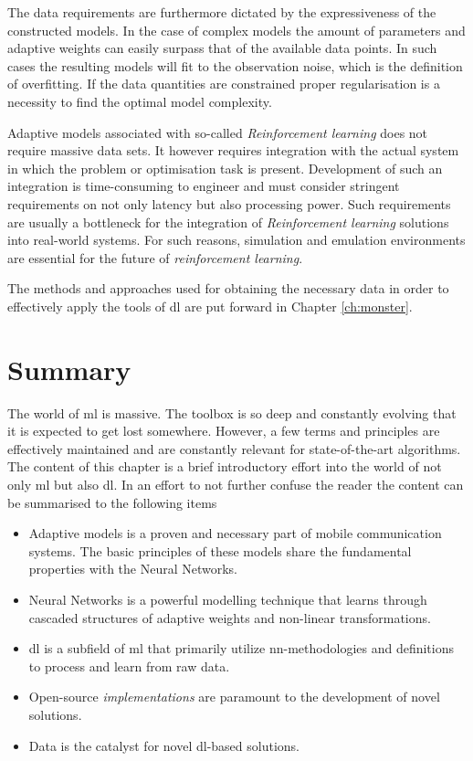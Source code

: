 The data requirements are furthermore dictated by the expressiveness of the constructed models. In the case of complex models the amount of parameters and adaptive weights can easily surpass that of the available data points. In such cases the resulting models will fit to the observation noise, which is the definition of overfitting. If the data quantities are constrained proper regularisation is a necessity to find the optimal model complexity. 

Adaptive models associated with so-called \emph{Reinforcement learning} does not require massive data sets. It however requires integration with the actual system in which the problem or optimisation task is present. Development of such an integration is time-consuming to engineer and must consider stringent requirements on not only latency but also processing power. Such requirements are usually a bottleneck for the integration of \emph{Reinforcement learning} solutions into real-world systems. For such reasons, simulation and emulation environments are essential for the future of \emph{reinforcement learning}. 

The methods and approaches used for obtaining the necessary data in order to effectively apply the tools of \gls{dl} are put forward in Chapter \ref{ch:monster}. 

\section{Summary}
The world of \gls{ml} is massive. The toolbox is so deep and constantly evolving that it is expected to get lost somewhere. However, a few terms and principles are effectively maintained and are constantly relevant for state-of-the-art algorithms. The content of this chapter is a brief introductory effort into the world of not only \gls{ml} but also \gls{dl}. In an effort to not further confuse the reader the content can be summarised to the following items

\begin{itemize}
    \item Adaptive models is a proven and necessary part of mobile communication systems. The basic principles of these models share the fundamental properties with the Neural Networks. 
    \item Neural Networks is a powerful modelling technique that learns through cascaded structures of adaptive weights and non-linear transformations.
    \item \gls{dl} is a subfield of \gls{ml} that primarily utilize \gls{nn}-methodologies and definitions to process and learn from raw data.
    \item Open-source \emph{implementations} are paramount to the development of novel solutions.
    \item Data is the catalyst for novel \gls{dl}-based solutions.
\end{itemize}



 